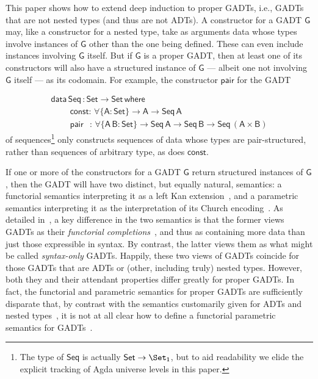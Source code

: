 \documentclass[9pt]{entcs}
\begin{document}
This paper shows how to extend deep induction to proper GADTs, i.e.,
GADTs that are not nested types (and thus are not ADTs).  A
constructor for a GADT $\mathsf{G}$ may, like a constructor for a
nested type, take as arguments data whose types involve instances of
$\mathsf{G}$ other than the one being defined. These can even include
instances involving $\mathsf{G}$ itself. But if $\mathsf{G}$ is a
proper GADT, then at least one of its constructors will also have a
structured instance of $\mathsf{G}$ --- albeit one not involving
$\mathsf{G}$ itself --- as its codomain.
For example, the constructor $\mathsf{pair}$ for the GADT 

\vspace*{-0.1in}

\begin{equation}\label{eq:seq}
\begin{array}{l}
\mathsf{data\, Seq\,: Set \to Set\,where}\\
\mathsf{\;\;\;\;\;\;\;\;const :\, \forall \{A : Set\} \to A \to Seq\,A}\\
\mathsf{\;\;\;\;\;\;\;\;pair\;\;\, :\,\forall \{A\,B : Set\} \to Seq \,A \to Seq\,B \to
  Seq\,(A \times B)}
\end{array}
\end{equation}
\noindent
of sequences\footnote{The type of $\mathsf{Seq}$ is actually
  $\mathsf{Set \to \Set_1}$, but to aid readability we elide the
  explicit tracking of Agda universe levels in this paper.} only
constructs sequences of data whose types are pair-structured, rather
than sequences of arbitrary type, as does $\mathsf{const}$.

If one or more of the constructors for a GADT $\mathsf{G}$ return
structured instances of $\mathsf{G}$, then the GADT will have two
distinct, but equally natural, semantics: a functorial semantics
interpreting it as a left Kan extension~\cite{mac71}, and a parametric
semantics interpreting it as the interpretation of its Church
encoding~\cite{atk12,vw10}. As detailed in~\cite{jgj21}, a key
difference in the two semantics is that the former views GADTs as
their {\em functorial completions}~\cite{jp19}, and thus as containing
more data than just those expressible in syntax. By contrast, the
latter views them as what might be called {\em syntax-only}
GADTs. Happily, these two views of GADTs coincide for those GADTs that
are ADTs or (other, including truly) nested types.  However, both they
and their attendant properties differ greatly for proper GADTs. In
fact, the functorial and parametric semantics for proper GADTs are
sufficiently disparate that, by contrast with the semantics
customarily given for ADTs and nested
types~\cite{bfss90,gjfor15,jgj21f}, it is not at all clear how to
define a functorial parametric semantics for GADTs~\cite{jgj21}.
\end{document}
